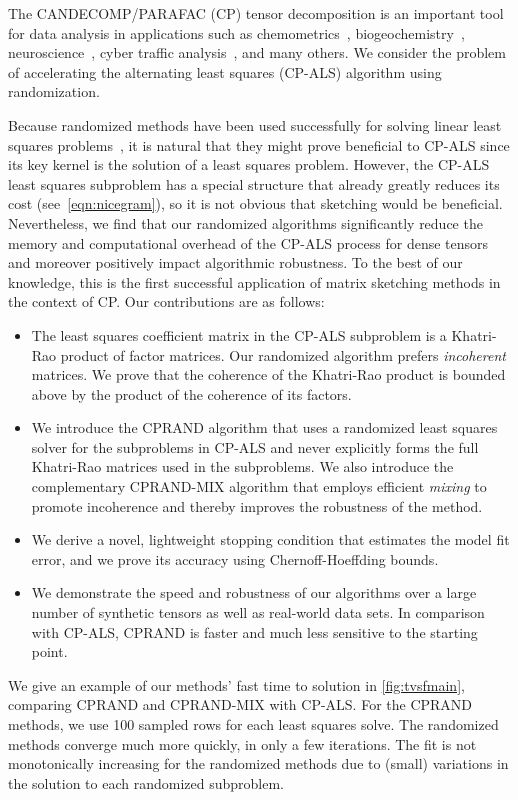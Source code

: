 The CANDECOMP/PARAFAC (CP) tensor decomposition is an important tool
for data analysis in applications such as chemometrics~\cite{MuStGrBr13}, biogeochemistry~\cite{JaCaYa14},
neuroscience~\cite{AcBiBiBr07,DaGiCaWa13,CoLiKuGo15}, cyber traffic analysis~\cite{MaGuFa11}, and many others.
%
We consider the problem of accelerating the alternating least squares (CP-ALS) algorithm using randomization.

Because randomized methods have been used successfully for solving
linear least squares problems~\cite{DrMaMuSa11,blendenpik,sketching}, it is natural that they might prove
beneficial to CP-ALS since its key kernel is the solution of a least
squares problem. However, the CP-ALS least squares subproblem has a
special structure that already greatly reduces its cost (see~\cref{eqn:nicegram}), so it is not obvious that sketching would be beneficial.
Nevertheless, we find that our randomized algorithms significantly reduce the memory and computational overhead of the CP-ALS process for dense tensors and moreover positively impact algorithmic robustness.
To the best of our knowledge, this is the first successful application of matrix sketching methods in the context of CP.
Our contributions are as follows:
\begin{itemize}
\item 
The least squares coefficient matrix in the CP-ALS subproblem is a Khatri-Rao product of factor matrices. 
Our randomized algorithm prefers \emph{incoherent} matrices.
We prove that the coherence of the Khatri-Rao product is bounded 
above by the product of the coherence of its factors.
\item We introduce the CPRAND algorithm that uses a randomized least squares solver for the subproblems in CP-ALS and never explicitly forms the full Khatri-Rao matrices used in the subproblems.
We also introduce the complementary CPRAND-MIX algorithm that employs efficient \emph{mixing} to promote incoherence and thereby improves the robustness of the method.
\item We derive a novel, lightweight stopping condition that estimates
  the model fit error, and we prove its accuracy using Chernoff-Hoeffding bounds.
\item We demonstrate the speed and robustness of our algorithms over a
  large number of synthetic tensors as well as real-world data
  sets. In comparison with CP-ALS, CPRAND is faster and much less sensitive to
  the starting point. 
\end{itemize}
We give an example of our methods' fast time to solution in \cref{fig:tvsfmain},
comparing CPRAND and CPRAND-MIX with CP-ALS.
For the CPRAND methods, we use 100 sampled rows for each least squares solve.
The randomized methods converge much more quickly, in only a few
iterations. 
The fit is not monotonically increasing for the randomized methods due
to (small) variations in the solution to each randomized subproblem.

